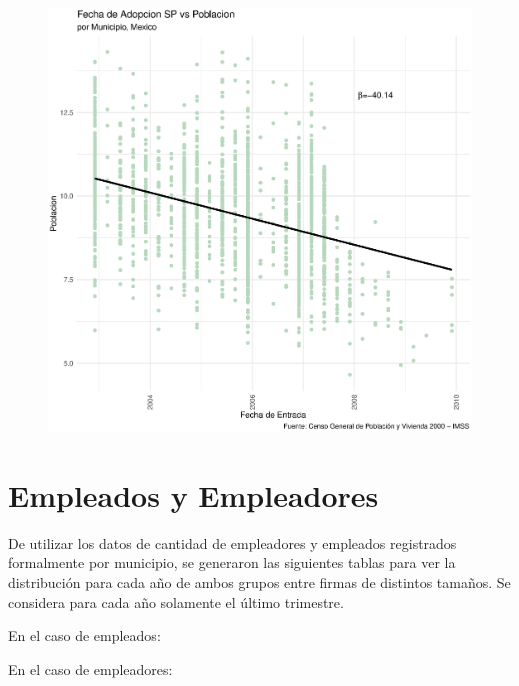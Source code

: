 \documentclass[9pt]{article}
\begin{document}
\begin{figure}[H]
    \centering
    \includegraphics[width=\textwidth]{Correlacion Cami.eps}
\end{figure}
\newpage
 \section*{Empleados y Empleadores}
 De utilizar los datos de cantidad de empleadores y empleados registrados formalmente por municipio, se generaron las siguientes tablas para ver la distribuci\'on para cada a\~no de ambos grupos entre firmas de distintos tama\~nos. Se considera para cada a\~no solamente el \'ultimo trimestre. 
 
 En el caso de empleados:
 
  En el caso de empleadores:
 
 
\end{document}
